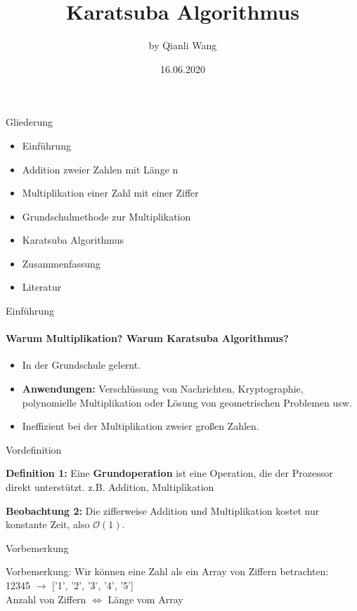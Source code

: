 \documentclass{beamer}
\title{Karatsuba Algorithmus}
\author{by Qianli Wang}
\date{16.06.2020}
\begin{document}
\maketitle
\begin{frame}{Gliederung}
\begin{itemize}
\item Einführung
\item Addition zweier Zahlen mit Länge n
\item Multiplikation einer Zahl mit einer Ziffer
\item Grundschulmethode zur Multiplikation
\item Karatsuba Algorithmus
\item Zusammenfassung
\item Literatur
\end{itemize}
\end{frame}


\begin{frame}{Einführung}
\framesubtitle{Warum Multiplikation? Warum Karatsuba Algorithmus?}
\begin{itemize}
    \item In der Grundschule gelernt. 
    \item \textbf{Anwendungen:} Verschlüssung von Nachrichten, Kryptographie, polynomielle Multiplikation oder Lösung von geometrischen Problemen usw. 
    \item Ineffizient bei der Multiplikation zweier großen Zahlen.
\end{itemize}
\end{frame}
\begin{frame}{Vordefinition}
    \begin{block}{\textbf{Definition 1:}}
    Eine \textbf{Grundoperation} ist eine Operation, die der Prozessor direkt unterstützt. z.B. Addition, Multiplikation
    \end{block}
    
    \begin{block}{\textbf{Beobachtung 2: }}
    Die zifferweise Addition und Multiplikation kostet nur konstante Zeit, also $\mathcal{O}(1)$.
    \end{block}
\end{frame}

\begin{frame}{Vorbemerkung}
    \begin{block}{Vorbemerkung:}
    Wir können eine Zahl als ein Array von Ziffern betrachten:\\
    12345 $\rightarrow$ ['1', '2', '3', '4', '5']\\
    Anzahl von Ziffern $\Leftrightarrow$ Länge vom Array
    \end{block}
\end{frame}
\end{document}
